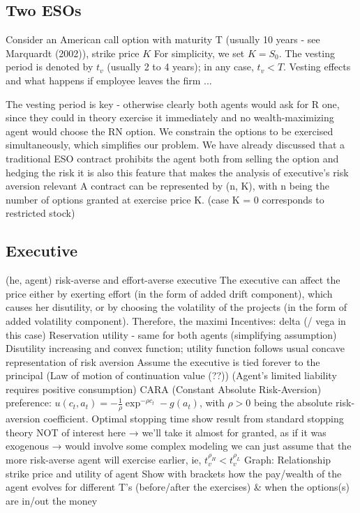 \subsection{Two ESOs}
Consider an American call option with maturity T (usually 10 years - see Marquardt (2002)), strike price $K$ 
For simplicity, we set $K=S_0$. The vesting period is denoted by $t_v$ (usually 2 to 4 years); in any case, $t_v < T$.
Vesting effects and what happens if employee leaves the firm ...

The vesting period is key - otherwise clearly both agents would ask for R one, since they could in theory exercise it immediately and no wealth-maximizing agent would choose the RN option.
We constrain the options to be exercised simultaneously, which simplifies our problem. 
We have already discussed that a traditional ESO contract prohibits the agent both from selling the option and hedging the risk
    it is also this feature that makes the analysis of executive's risk aversion relevant
A contract can be represented by (n, K), with n being the number of options granted at exercise price K. (case K = 0 corresponds to restricted stock)


\subsection{Executive}
(he, agent) risk-averse and effort-averse executive 
The executive can affect the price either by exerting effort (in the form of added drift component), which causes her disutility, or by choosing the volatility of the projects (in the form of added volatility component). Therefore, the maximi
Incentives: delta (/ vega in this case)
Reservation utility - same for both agents (simplifying assumption)
Disutility increasing and convex function; utility function follows usual concave representation of risk aversion
Assume the executive is tied forever to the principal
(Law of motion of continuation value (??))
(Agent's limited liability requires positive consumption)
CARA (Constant Absolute Risk-Aversion) preference: $u(c_t, a_t) = -\frac{1}{\rho} \exp^{-\rho c_t} - g(a_t)$, with $\rho>0$ being the absolute risk-aversion coefficient.
Optimal stopping time 
    show result from standard stopping theory
    NOT of interest here → we'll take it almost for granted, as if it was exogenous → would involve some complex modeling
    we can just assume that the more risk-averse agent will exercise earlier, ie, $t_v^{\rho_H} < t_v^{\rho_L}$
Graph: Relationship strike price and utility of agent
Show with brackets how the pay/wealth of the agent evolves for different T's (before/after the exercises) \& when the options(s) are in/out the money


